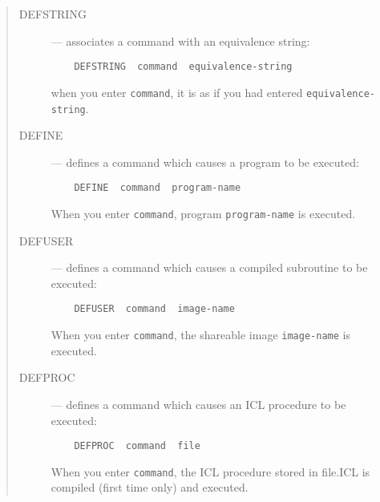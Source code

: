 \begin{quote}
\begin{description}

\item [DEFSTRING] --- associates a command with an equivalence string:

\begin{small}
\begin{verbatim}
    DEFSTRING  command  equivalence-string
\end{verbatim}
\end{small}

when you enter {\small\tt command}, it is as if you had entered
{\small\tt equivalence-string}.

\item [DEFINE] --- defines a command which causes a program to be executed:

\begin{small}
\begin{verbatim}
    DEFINE  command  program-name
\end{verbatim}
\end{small}

When you enter {\small\tt command}, program {\small\tt program-name} is
executed.

\item [DEFUSER] --- defines a command which causes a compiled subroutine to
be executed:

\begin{small}
\begin{verbatim}
    DEFUSER  command  image-name
\end{verbatim}
\end{small}

When you enter {\small\tt command}, the shareable image {\small\tt image-name}
is executed.

\item [DEFPROC] --- defines a command which causes an ICL procedure to be
executed:

\begin{small}
\begin{verbatim}
    DEFPROC  command  file
\end{verbatim}
\end{small}

When you enter {\small\tt command}, the ICL procedure stored in file.ICL is
compiled (first time only) and executed.

\end{description}
\end{quote}

